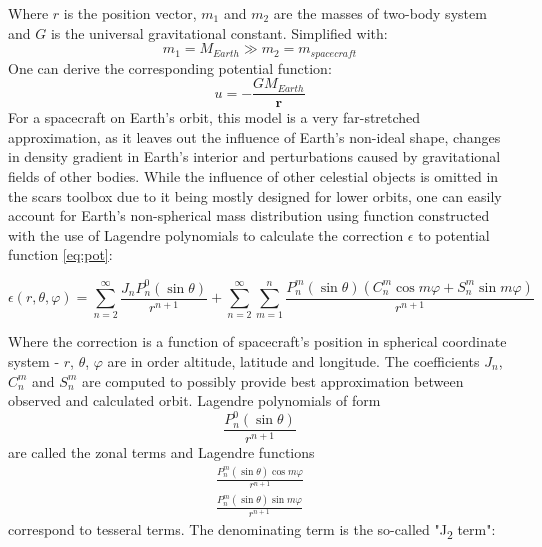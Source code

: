         Where $r$ is the position vector, $m_1$ and $m_2$ are the masses of two-body system and $G$ is the universal gravitational constant. Simplified with:
        \begin{equation}
            m_1 = M_{Earth} \gg m_2 = m_{spacecraft}
        \end{equation}
        One can derive the corresponding potential function:
        \begin{equation}
            u = -\frac{GM_{Earth}}{\textbf{r}}\label{eq:pot}
        \end{equation}
        For a spacecraft on Earth's orbit, this model is a very far-stretched approximation, as it leaves out the influence of Earth's non-ideal shape, changes in density gradient in Earth's interior and perturbations caused by gravitational fields of other bodies. While the influence of other celestial objects is omitted in the \ac{scars} toolbox due to it being mostly designed for lower orbits, one can easily account for Earth's non-spherical mass distribution using function constructed with the use of Lagendre polynomials to calculate the correction $\epsilon$ to potential function \eqref{eq:pot}:

        \begin{equation}
            \epsilon(r, \theta, \varphi) = \sum_{n=2}^{\infty}  \frac{J_n P^0_n(\sin\theta) }{r^{n+1}} + \sum_{n=2}^{\infty} \sum_{m=1}^n \frac{ P^m_n(\sin\theta) (C_n^m \cos m\varphi + S_n^m \sin m\varphi)}{r^{n+1}}\label{eq:geopot}
        \end{equation}

        Where the correction is a function of spacecraft's position in spherical coordinate system - $r$, $\theta$, $\varphi$ are in order altitude, latitude and longitude. The coefficients $J_n$, $C_n^m$ and $S_n^m$ are computed to possibly provide best approximation between observed and calculated orbit. Lagendre polynomials of form 
        \begin{equation}
            \frac{P^0_n(\sin\theta) }{r^{n+1}}    
        \end{equation}
        are called the zonal terms and Lagendre functions 
        \begin{equation}
        \begin{aligned}
            \frac{ P^m_n(\sin\theta) \cos m\varphi}{r^{n+1}}\\
            \frac{ P^m_n(\sin\theta) \sin m\varphi}{r^{n+1}}
        \end{aligned}
        \end{equation}
        correspond to tesseral terms. The denominating term is the so-called "J\textsubscript{2} term":

